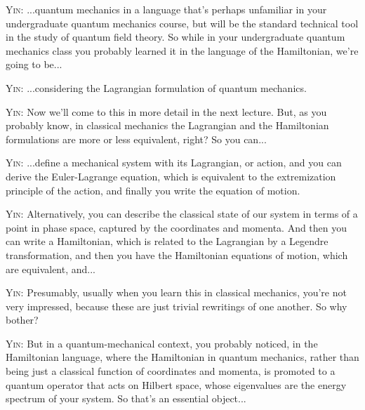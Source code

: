 \noindent\textsc{Yin:} ...quantum mechanics in a language that's perhaps unfamiliar in your undergraduate quantum mechanics course, but will be the standard technical tool in the study of quantum field theory. So while in your undergraduate quantum mechanics class you probably learned it in the language of the Hamiltonian, we're going to be...\par

\noindent\textsc{Yin:} ...considering the Lagrangian formulation of quantum mechanics.\par

\noindent\textsc{Yin:} Now we'll come to this in more detail in the next lecture. But, as you probably know, in classical mechanics the Lagrangian and the Hamiltonian formulations are more or less equivalent, right? So you can...\par

\noindent\textsc{Yin:} ...define a mechanical system with its Lagrangian, or action, and you can derive the Euler-Lagrange equation, which is equivalent to the extremization principle of the action, and finally you write the equation of motion.\par

\noindent\textsc{Yin:} Alternatively, you can describe the classical state of our system in terms of a point in phase space, captured by the coordinates and momenta. And then you can write a Hamiltonian, which is related to the Lagrangian by a Legendre transformation, and then you have the Hamiltonian equations of motion, which are equivalent, and...\par

\noindent\textsc{Yin:} Presumably, usually when you learn this in classical mechanics, you're not very impressed, because these are just trivial rewritings of one another. So why bother?\par

\noindent\textsc{Yin:} But in a quantum-mechanical context, you probably noticed, in the Hamiltonian language, where the Hamiltonian in quantum mechanics, rather than being just a classical function of coordinates and momenta, is promoted to a quantum operator that acts on Hilbert space, whose eigenvalues are the energy spectrum of your system. So that's an essential object...\par


